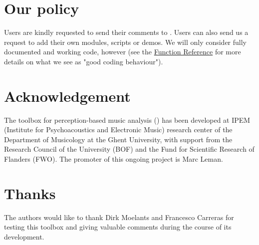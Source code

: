 \section*{Our policy}
Users are kindly requested to send their comments to
\IPEMMailSupport. Users can also send us a request to add their
own modules, scripts or demos. We will only consider fully
documented and working code, however (see the
\hyperlink{Chapter:FuncRef}{Function Reference} for more details
on what we see as "good coding behaviour").\\

\section*{Acknowledgement}
The toolbox for perception-based music analysis (\IPEMVersion) has
been developed at IPEM (Institute for Psychoacoustics and
Electronic Music) research center of the Department of Musicology
at the Ghent University, with support from the Research Council of
the University (BOF) and the Fund for Scientific Research of
Flanders (FWO). The promoter of this ongoing project is Marc
Leman.

\section*{Thanks}
The authors would like to thank Dirk Moelants and Francesco
Carreras for testing this toolbox and giving valuable comments
during the course of its development.
